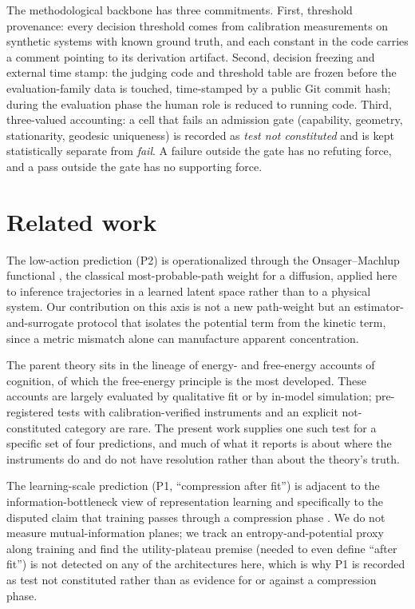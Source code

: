 \documentclass{article}
\begin{document}
The methodological backbone has three commitments. First, threshold provenance:
every decision threshold comes from calibration measurements on synthetic
systems with known ground truth, and each constant in the code carries a comment
pointing to its derivation artifact. Second, decision freezing and external
time stamp: the judging code and threshold table are frozen before the
evaluation-family data is touched, time-stamped by a public Git commit hash;
during the evaluation phase the human role is reduced to running code. Third,
three-valued accounting: a cell that fails an admission gate (capability,
geometry, stationarity, geodesic uniqueness) is recorded as \emph{test not
constituted} and is kept statistically separate from \emph{fail}. A failure
outside the gate has no refuting force, and a pass outside the gate has no
supporting force.

\section{Related work}
\label{sec:related}

The low-action prediction (P2) is operationalized through the Onsager--Machlup
functional \citep{onsager1953om}, the classical most-probable-path weight for a
diffusion, applied here to inference trajectories in a learned latent space rather
than to a physical system. Our contribution on this axis is not a new path-weight
but an estimator-and-surrogate protocol that isolates the potential term from the
kinetic term, since a metric mismatch alone can manufacture apparent
concentration.

The parent theory sits in the lineage of energy- and free-energy accounts of
cognition, of which the free-energy principle \citep{friston2010fep} is the most
developed. These accounts are largely evaluated by qualitative fit or by
in-model simulation; pre-registered tests with calibration-verified instruments
and an explicit not-constituted category are rare. The present work supplies one
such test for a specific set of four predictions, and much of what it reports is
about where the instruments do and do not have resolution rather than about the
theory's truth.

The learning-scale prediction (P1, ``compression after fit'') is adjacent to the
information-bottleneck view of representation learning \citep{tishby1999ib,
tishby2015ibdl} and specifically to the disputed claim that training passes
through a compression phase \citep{shwartzziv2017blackbox}. We do not measure
mutual-information planes; we track an entropy-and-potential proxy along training
and find the utility-plateau premise (needed to even define ``after fit'') is
not detected on any of the architectures here, which is why P1 is recorded as
test not constituted rather than as evidence for or against a compression phase.
\end{document}

